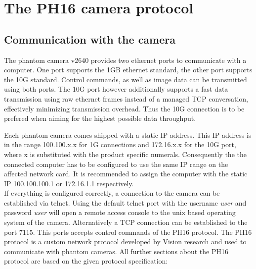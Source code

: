 
\section{The PH16 camera protocol}

\subsection{Communication with the camera}
The phantom camera v2640 provides two ethernet ports to communicate with a computer. One port supports the 1GB ethernet standard, the other port supports the 10G standard. Control commands, as well as image data can be transmitted using both ports. The 10G port however additionally supports a fast data transmission using raw ethernet frames instead of a managed TCP conversation, effectively minimizing transmission overhead. Thus the 10G connection is to be prefered when aiming for the highest possible data throughput.\cite{PhantomDatasheet} \par
Each phantom camera comes shipped with a static IP address. This IP address is in the range 100.100.x.x for 1G connections and 172.16.x.x for the 10G port, where x is substituted with the product specific numerals. Consequently the the connected computer has to be configured to use the same IP range on the affected network card. It is recommended to assign the computer with the static IP 100.100.100.1 or 172.16.1.1 respectively.\cite{PhantomManual}\\
If everything is configured correctly, a connection to the camera can be established via telnet. Using the default telnet port with the username \textit{user} and password \textit{user} will open a remote access console to the unix based operating system of the camera. Alternatively a TCP connection can be established to the port 7115. This ports accepts control commands of the PH16 protocol. The PH16 protocol is a custom network protocol developed by Vision research and used to communicate with phantom cameras. All further sections about the PH16 protocol are based on the given  protocol specification:\cite{PH16Protocol}


